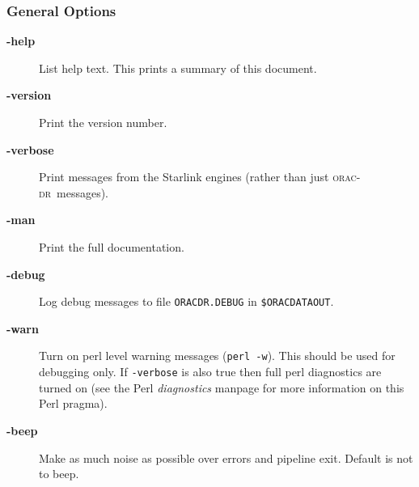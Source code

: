 \documentclass[twoside,11pt]{article}
\renewcommand{\_}{\texttt{\symbol{95}}}
\newcommand{\oracdr}{\textsc{orac-dr}}
\begin{document}
\subsubsection*{General Options\label{oracdr_General_Options}}
\begin{description}
\item[\textbf{-help}] \mbox{}

List help text. This prints a summary of this document.

\item[\textbf{-version}] \mbox{}

Print the version number.

\item[\textbf{-verbose}] \mbox{}

Print messages from the Starlink engines (rather than just \oracdr\
messages).

\item[\textbf{-man}] \mbox{}

Print the full documentation.

\item[\textbf{-debug}] \mbox{}

Log debug messages to file \texttt{ORACDR.DEBUG} in \texttt{\$ORAC\_DATA\_OUT}.

\item[\textbf{-warn}] \mbox{}

Turn on perl level warning messages (\texttt{perl -w}). This should be
used for debugging only. If \texttt{-verbose} is also true then full
perl diagnostics are turned on (see the Perl \emph{diagnostics}
manpage for more information on this Perl pragma).

\item[\textbf{-beep}] \mbox{}

Make as much noise as possible over errors and pipeline exit.
Default is not to beep.

\end{description}
\end{document}

